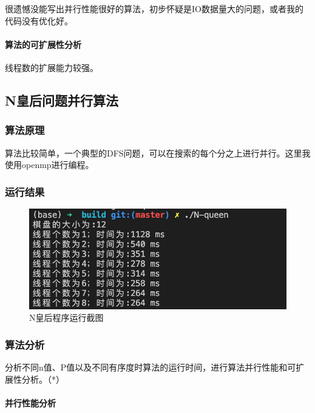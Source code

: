 \documentclass[10pt]{article}
\begin{document}
很遗憾没能写出并行性能很好的算法，初步怀疑是IO数据量大的问题，或者我的代码没有优化好。


\paragraph{算法的可扩展性分析}

线程数的扩展能力较强。



\subsection{N皇后问题并行算法}

\subsubsection{算法原理}

算法比较简单，一个典型的DFS问题，可以在搜索的每个分之上进行并行。这里我使用openmp进行编程。

\subsubsection{运行结果}

\begin{figure}[htbp]
    \centering
    \includegraphics[width=.6\textwidth]{assets/n-queen-performance.png}
    \caption{N皇后程序运行截图}
    \label{N皇后程序运行截图}
\end{figure}

\subsubsection{算法分析}
分析不同n值、P值以及不同有序度时算法的运行时间，进行算法并行性能和可扩展性分析。（*）

\paragraph{并行性能分析}
\end{document}

